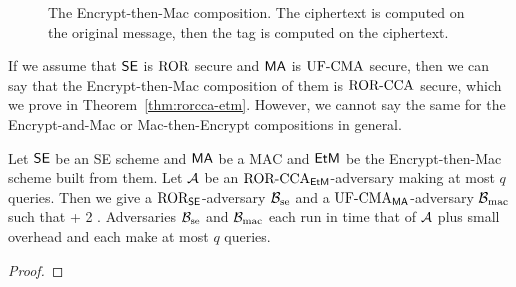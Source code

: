 \begin{figure}[h]
	\centering
	\caption{The Encrypt-then-Mac composition. The ciphertext is computed on the original message, then the tag is computed on the ciphertext.}
\end{figure}

If we assume that ${\mathsf{SE}}$ is $\textnormal{ROR}$ secure and $\mathsf{MA}$ is $\textnormal{UF-CMA}$ secure, then we can say that the Encrypt-then-Mac composition of them is $\textnormal{ROR-CCA}$ secure, which we prove in Theorem~\ref{thm:rorcca-etm}. However, we cannot say the same for the Encrypt-and-Mac or Mac-then-Encrypt compositions in general. 

\begin{theorem}
Let ${\mathsf{SE}}$ be an SE scheme and $\mathsf{MA}$ be a MAC and $\mathsf{EtM}$ be the Encrypt-then-Mac
scheme built from them.  Let ${\mathcal A}$ be an $\textnormal{ROR-CCA}_{\mathsf{EtM}}$-adversary making at most
$q$ queries. Then we give a $\textnormal{ROR}_{\mathsf{SE}}$-adversary ${\mathcal B}_{\textrm{se}}$ 
and a $\textnormal{UF-CMA}_{\mathsf{MA}}$-adversary  ${\mathcal B}_\textrm{mac}$ 
such that
\bnm
  \AdvRORCCA{\EtM}{\advA} \le {} + 2\cdotsm{} \;.
\enm
Adversaries ${\mathcal B}_\textrm{se}$ and ${\mathcal B}_{\textrm{mac}}$ each run in time that of 
${\mathcal A}$ plus small overhead and each make at most $q$ queries.
\label{thm:rorcca-etm}
\end{theorem}
\begin{proof}
\end{proof}